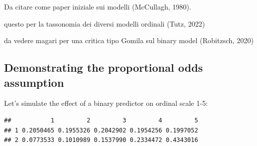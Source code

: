 \documentclass[
  man,floatsintext]{apa6}
\newenvironment{Shaded}{\begin{snugshade}}{\end{snugshade}}
\newcommand{\AttributeTok}[1]{\textcolor[rgb]{0.13,0.29,0.53}{#1}}
\newcommand{\CommentTok}[1]{\textcolor[rgb]{0.56,0.35,0.01}{\textit{#1}}}
\newcommand{\DecValTok}[1]{\textcolor[rgb]{0.00,0.00,0.81}{#1}}
\newcommand{\FloatTok}[1]{\textcolor[rgb]{0.00,0.00,0.81}{#1}}
\newcommand{\FunctionTok}[1]{\textcolor[rgb]{0.13,0.29,0.53}{\textbf{#1}}}
\newcommand{\NormalTok}[1]{#1}
\newcommand{\OtherTok}[1]{\textcolor[rgb]{0.56,0.35,0.01}{#1}}
\newcommand{\SpecialCharTok}[1]{\textcolor[rgb]{0.81,0.36,0.00}{\textbf{#1}}}
\newcommand{\StringTok}[1]{\textcolor[rgb]{0.31,0.60,0.02}{#1}}
\begin{document}
Da citare come paper iniziale sui modelli (McCullagh, 1980).

questo per la tassonomia dei diversi modelli ordinali (Tutz, 2022)

da vedere magari per una critica tipo Gomila sul binary model (Robitzsch, 2020)

\subsection{Demonstrating the proportional odds assumption}\label{demonstrating-the-proportional-odds-assumption}

Let's simulate the effect of a binary predictor on ordinal scale 1-5:

\begin{Shaded}
\end{Shaded}

\begin{verbatim}
##           1         2         3         4         5
## 1 0.2050465 0.1955326 0.2042902 0.1954256 0.1997052
## 2 0.0773533 0.1010989 0.1537990 0.2334472 0.4343016
\end{verbatim}
\end{document}
